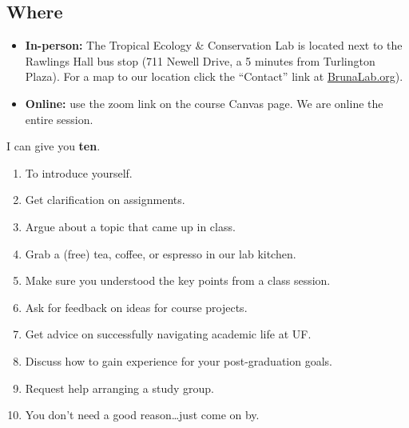 \documentclass[
  10pt,
  letterpaper,
  oneside,
  open=any]{scrbook}
\providecommand{\tightlist}{%
  \setlength{\itemsep}{0pt}\setlength{\parskip}{0pt}}
\begin{document}
\subsection*{Where}\label{where}

\begin{itemize}
\item
  \textbf{In-person:} The Tropical Ecology \& Conservation Lab is
  located next to the Rawlings Hall bus stop (711 Newell Drive, a 5
  minutes from Turlington Plaza). For a map to our location click the
  ``Contact'' link at \href{http://brunalab.org}{BrunaLab.org}).
\item
  \textbf{Online:} use the zoom link on the course Canvas page. We are
  online the entire session.
\end{itemize}

\begin{tcolorbox}[enhanced jigsaw, colframe=quarto-callout-tip-color-frame, colbacktitle=quarto-callout-tip-color!10!white, title=\textcolor{quarto-callout-tip-color}{\faLightbulb}\hspace{0.5em}{Can you give me one good reason why I should go to Office Hours?}, breakable, coltitle=black, titlerule=0mm, leftrule=.75mm, left=2mm, opacitybacktitle=0.6, toprule=.15mm, opacityback=0, bottomtitle=1mm, toptitle=1mm, arc=.35mm, colback=white, rightrule=.15mm, bottomrule=.15mm]

I can give you \textbf{ten}.

\begin{enumerate}
\def\labelenumi{\arabic{enumi}.}
\tightlist
\item
  To introduce yourself.
\item
  Get clarification on assignments.
\item
  Argue about a topic that came up in class.
\item
  Grab a (free) tea, coffee, or espresso in our lab kitchen.
\item
  Make sure you understood the key points from a class session.
\item
  Ask for feedback on ideas for course projects.
\item
  Get advice on successfully navigating academic life at UF.
\item
  Discuss how to gain experience for your post-graduation goals.
\item
  Request help arranging a study group.
\item
  You don't need a good reason\ldots just come on by.
\end{enumerate}

\end{tcolorbox}
\end{document}
